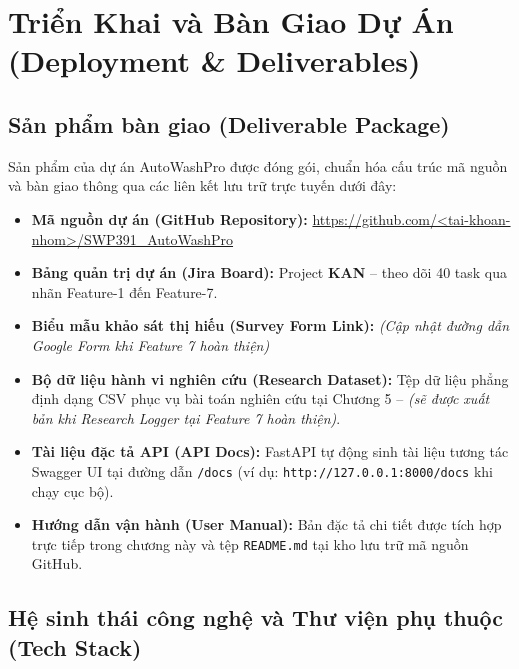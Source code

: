 \chapter{Triển Khai và Bàn Giao Dự Án (Deployment \& Deliverables)}

\section{Sản phẩm bàn giao (Deliverable Package)}
Sản phẩm của dự án AutoWashPro được đóng gói, chuẩn hóa cấu trúc mã nguồn và bàn giao thông qua các liên kết lưu trữ trực tuyến dưới đây:
\begin{itemize}
    \item \textbf{Mã nguồn dự án (GitHub Repository):} \url{https://github.com/<tai-khoan-nhom>/SWP391_AutoWashPro}
    \item \textbf{Bảng quản trị dự án (Jira Board):} Project \textbf{KAN} -- theo dõi 40 task qua nhãn Feature-1 đến Feature-7.
    \item \textbf{Biểu mẫu khảo sát thị hiếu (Survey Form Link):} \textit{(Cập nhật đường dẫn Google Form khi Feature 7 hoàn thiện)}
    \item \textbf{Bộ dữ liệu hành vi nghiên cứu (Research Dataset):} Tệp dữ liệu phẳng định dạng CSV phục vụ bài toán nghiên cứu tại Chương 5 -- \textit{(sẽ được xuất bản khi Research Logger tại Feature 7 hoàn thiện)}.
    \item \textbf{Tài liệu đặc tả API (API Docs):} FastAPI tự động sinh tài liệu tương tác Swagger UI tại đường dẫn \texttt{/docs} (ví dụ: \texttt{http://127.0.0.1:8000/docs} khi chạy cục bộ).
    \item \textbf{Hướng dẫn vận hành (User Manual):} Bản đặc tả chi tiết được tích hợp trực tiếp trong chương này và tệp \texttt{README.md} tại kho lưu trữ mã nguồn GitHub.
\end{itemize}

\section{Hệ sinh thái công nghệ và Thư viện phụ thuộc (Tech Stack)}

